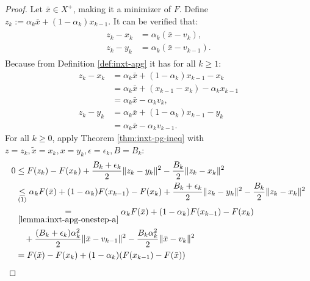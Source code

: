 \documentclass[12pt]{article}
\begin{document}
    \begin{proof}
        Let $\bar x \in X^+$, making it a minimizer of $F$. 
        Define $z_k := \alpha_k \bar x + (1 - \alpha_k)x_{k - 1}$. 
        It can be verified that:
        \begin{align}\begin{split}
            z_k - x_k &= \alpha_k(\bar x - v_k),
            \\
            z_k - y_k &= \alpha_k(\bar x - v_{k - 1}).     
        \end{split}\tag{a}\label{lemma:inxt-apg-onestep-a}
        \end{align}
        Because from Definition \ref{def:inxt-apg} it has for all $k \ge 1$: 
        \begin{align*}
            z_k - x_k &= 
            \alpha_k \bar x + (1 - \alpha_k)x_{k - 1} - x_k
            \\
            &= \alpha_k\bar x + (x_{k - 1} - x_k) - \alpha_kx_{k - 1}
            \\
            &= \alpha_k \bar x - \alpha_k v_k, 
            \\
            z_k - y_k &= 
            \alpha_k \bar x + (1 - \alpha_k)x_{k - 1} - y_k
            \\
            &= \alpha_k \bar x - \alpha_k v_{k - 1}. 
        \end{align*}
        For all $k \ge 0$, apply Theorem \ref{thm:inxt-pg-ineq} with $z = z_k, \tilde x = x_k, x = y_k, \epsilon = \epsilon_k, B = B_k$: 
        \begin{align*}
            0 &\le 
            F(z_k) - F(x_k) +
            \frac{B_k + \epsilon_k}{2}\Vert z_k - y_k\Vert^2
            - \frac{B_k}{2}\Vert z_k - x_k\Vert^2
            \\
            &\underset{(1)}{\le}
            \alpha_k F(\bar x) + (1 - \alpha_k)F(x_{k - 1}) - F(x_k)
            + 
            \frac{B_k + \epsilon_k}{2}\Vert z_k - y_k\Vert^2
            - \frac{B_k}{2}\Vert z_k - x_k\Vert^2
            \\
            &\underset{\eqref{lemma:inxt-apg-onestep-a}}{=} 
            \alpha_k F(\bar x) + (1 - \alpha_k)F(x_{k - 1}) - F(x_k)
                \\ &\quad 
                + \frac{(B_k + \epsilon_k)\alpha_k^2}{2}\Vert \bar x - v_{k - 1} \Vert^2
                - \frac{B_k\alpha_k^2}{2}\Vert \bar x - v_k\Vert^2
            \\
            &= 
            F(\bar x) - F(x_k)
            + (1 - \alpha_k)(F(x_{k - 1}) - F(\bar x))

\end{align*}
\end{proof}
\end{document}
